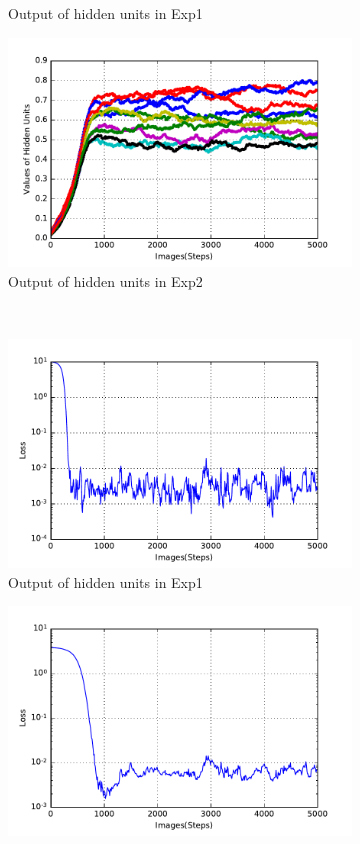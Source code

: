 \begin{figure}
\begin{subfigure}[t]{0.4\textwidth}
		\caption{Output of hidden units in Exp1}
	\end{subfigure}
	\begin{subfigure}[t]{0.4\textwidth}
		\includegraphics[width=\textwidth]{pics_sdlm/30_exp_RBM/exp2_hid_non.pdf}
		\caption{Output of hidden units in Exp2}
	\end{subfigure}\\
	\begin{subfigure}[t]{0.4\textwidth}
		\includegraphics[width=\textwidth]{pics_sdlm/30_exp_RBM/exp1_loss.pdf}
		\caption{Output of hidden units in Exp1}
	\end{subfigure}
	\begin{subfigure}[t]{0.4\textwidth}
		\includegraphics[width=\textwidth]{pics_sdlm/30_exp_RBM/exp2_loss.pdf}

\end{subfigure}
\end{figure}
